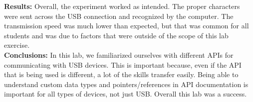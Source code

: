 \documentclass{article}
\newcommand{\sect}[1]{\noindent\textbf{#1}}
\begin{document}
\sect{Results:} Overall, the experiment worked as intended. The proper characters were sent across the USB connection and recognized by the computer. The transmission speed was much lower than expected, but that was common for all students and was due to factors that were outside of the scope of this lab exercise. \\

\sect{Conclusions:} In this lab, we familiarized ourselves with different APIs for communicating with USB devices. This is important because, even if the API that is being used is different, a lot of the skills transfer easily. Being able to understand custom data types and pointers/references in API documentation is important for all types of devices, not just USB. Overall this lab was a success.
\end{document}
